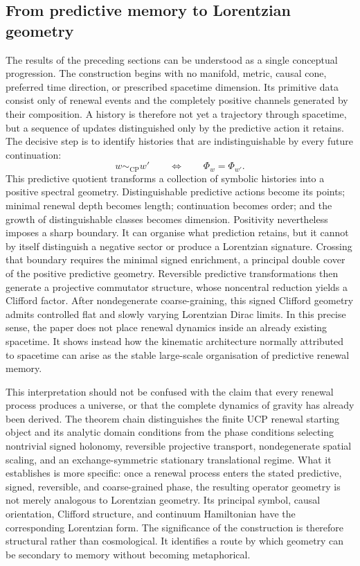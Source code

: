 \documentclass[11pt]{article}
\theoremstyle{definition}
\theoremstyle{remark}
\newcommand{\CP}{\mathrm{CP}}
\begin{document}

\subsection{From predictive memory to Lorentzian geometry}
\label{subsec:interpretation}
\label{subsec:self-averaging-interpretation}

The results of the preceding sections can be understood as a single
conceptual progression.  The construction begins with no manifold, metric,
causal cone, preferred time direction, or prescribed spacetime dimension.
Its primitive data consist only of renewal events and the completely positive
channels generated by their composition.  A history is therefore not yet a
trajectory through spacetime, but a sequence of updates distinguished only by
the predictive action it retains.
%
The decisive step is to identify histories that are indistinguishable by
every future continuation:
\[
    w\sim_{\CP}w'
    \qquad\Longleftrightarrow\qquad
    \Phi_w=\Phi_{w'}.
\]
This predictive quotient transforms a collection of symbolic histories into a
positive spectral geometry.  Distinguishable predictive actions become its
points; minimal renewal depth becomes length; continuation becomes order; and
the growth of distinguishable classes becomes dimension.
%
Positivity nevertheless imposes a sharp boundary.  It can organise what
prediction retains, but it cannot by itself distinguish a negative sector or
produce a Lorentzian signature.  Crossing that boundary requires the minimal
signed enrichment, a principal double cover of the positive predictive
geometry.  Reversible predictive transformations then generate a projective
commutator structure, whose noncentral reduction yields a Clifford factor.
After nondegenerate coarse-graining, this signed Clifford geometry admits
controlled flat and slowly varying Lorentzian Dirac limits.  In this precise sense, the paper does not place renewal dynamics inside an
already existing spacetime.  It shows instead how the kinematic architecture
normally attributed to spacetime can arise as the stable large-scale
organisation of predictive renewal memory.


This interpretation should not be confused with the claim that every renewal
process produces a universe, or that the complete dynamics of gravity has
already been derived.  The theorem chain distinguishes the finite UCP renewal
starting object and its analytic domain conditions from the phase conditions
selecting nontrivial signed holonomy, reversible projective transport,
nondegenerate spatial scaling, and an exchange-symmetric stationary
translational regime.  What it establishes is more specific: once a renewal
process enters the stated predictive, signed, reversible, and coarse-grained
phase, the resulting operator geometry is not merely analogous to Lorentzian
geometry.  Its principal symbol, causal orientation, Clifford structure, and
continuum Hamiltonian have the corresponding Lorentzian form.  The
significance of the construction is therefore structural rather than
cosmological.  It identifies a route by which geometry can be secondary to
memory without becoming metaphorical.
\end{document}
